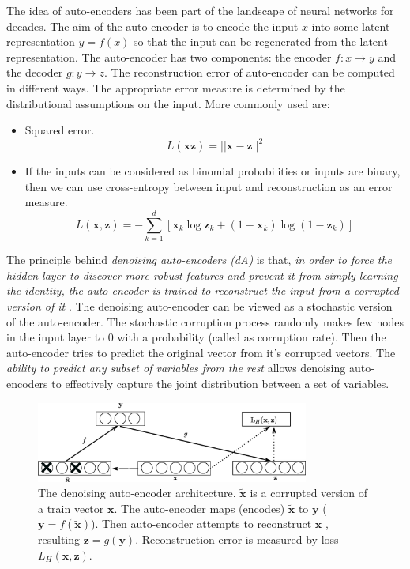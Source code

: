 The idea of auto-encoders has been part of the landscape of neural networks for decades. The aim of the auto-encoder is to encode the input $x$ into some latent representation $y = f(x)$ so that the input can be regenerated from the latent representation. The auto-encoder has two components: the encoder $f:x \rightarrow y$ and the decoder $g:y \rightarrow z$. The reconstruction error of auto-encoder can be computed in different ways. The appropriate error measure is determined by the distributional assumptions on the input. More commonly used are:
\begin{itemize}
\item Squared error.
$$ L(\mathbf{x} \mathbf{z}) = || \mathbf{x} - \mathbf{z} ||^2$$
\item If the inputs can be considered as binomial probabilities or inputs are binary, then we can use cross-entropy between input and reconstruction as an error measure.
$$L(\mathbf{x}, \mathbf{z}) = - \sum^d_{k=1}[\mathbf{x}_k \log \mathbf{z}_k + (1 - \mathbf{x}_k)\log(1 - \mathbf{z}_k)]$$
\end{itemize}

The principle behind \emph{denoising auto-encoders (dA)} is that, \textit{in order to force the hidden layer to discover more robust features and prevent it from simply learning the identity, the auto-encoder is trained to reconstruct the input from a corrupted version of it} \cite{vincent2008extracting}. The denoising auto-encoder can be viewed as a stochastic version of the auto-encoder. The stochastic corruption process randomly makes few nodes in the input layer to $0$ with a probability (called as corruption rate). Then the auto-encoder tries to predict the original vector from it's corrupted vectors. The \textit{ability to predict any subset of variables from the rest} allows denoising auto-encoders to effectively capture the joint distribution between a set of variables.

\begin{figure}[ht]
\centering
\includegraphics[width=0.8\textwidth]{./imgs/sda.eps}
\caption[The denoising auto-encoder architecture]{The denoising auto-encoder architecture. $\mathbf{\tilde{x}}$ is a corrupted version of a train vector $\mathbf{x}$. The auto-encoder maps (encodes) $\mathbf{\tilde{x}}$ to $\mathbf{y}$ ($\mathbf{y} = f(\mathbf{\tilde{x}})$). Then auto-encoder attempts to reconstruct $\mathbf{x}$ , resulting $ \mathbf{z} = g(\mathbf{y}) $. Reconstruction error is measured by loss $L_{H}(\mathbf{x},\mathbf{z})$. }
\label{fig:sdaChain}
\end{figure}

